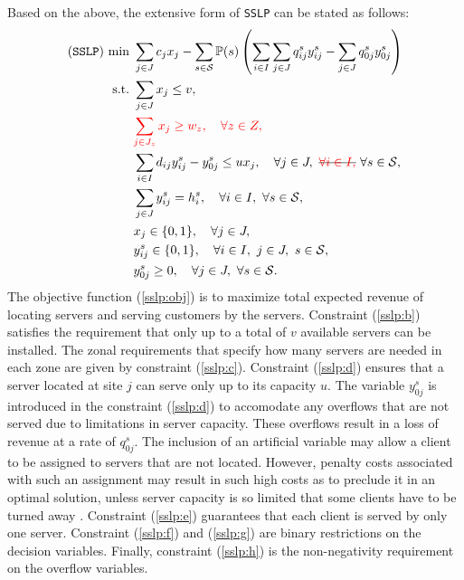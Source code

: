 Based on the above, the extensive form of \texttt{SSLP} can be stated as follows:
\begin{subequations}
	\begin{align}
	(\texttt{SSLP})\ \textrm{min}\ &	\sum_{j\in J}c_j x_j - \sum_{s\in\mathcal{S}}\PP(s)\left(\sum_{i\in I}\sum_{j\in J}q_{ij}^s y_{ij}^s - \sum_{j\in J}q_{0j}^s y_{0j}^s \right) \label{sslp:obj} \\ 
	\textrm{s.t.}\ &\sum_{j\in J}x_j\le v,\label{sslp:b}\\ 
	&\textcolor{red}{\sum_{j\in J_z}x_j\ge w_z,\quad\forall z\in Z,}\label{sslp:c}\\
	&\sum_{i\in I}d_{ij}y_{ij}^s - y_{0j}^s\le ux_j,\quad\forall j\in J,\ \stkout{\textcolor{red}{\forall i\in I,}}\ \forall s\in\mathcal{S}, \label{sslp:d} \\
	&\sum_{j\in J}y_{ij}^s=h_i^s,\quad\forall i\in I,\ \forall s\in \mathcal{S}, \label{sslp:e}\\
	&x_j\in\{0,1\},\quad\forall j\in J,\label{sslp:f}\\
	&y_{ij}^s\in\{0,1\},\quad\forall i\in I,\ j\in J,\ s\in\mathcal{S}, \label{sslp:g}\\
	&y_{0j}^s\ge 0,\quad\forall j\in J,\ \forall s\in\mathcal{S} \label{sslp:h}.
	\end{align}
\end{subequations}
The objective function (\ref{sslp:obj}) is to maximize total expected revenue of locating servers and serving customers by the servers. Constraint (\ref{sslp:b}) satisfies the requirement that only up to a total of $v$ available servers can be installed. The zonal requirements that specify how many servers are needed in each zone are given by constraint (\ref{sslp:c}). Constraint (\ref{sslp:d}) ensures that a server located at site $j$ can serve only up to its capacity $u$. The variable $y_{0j}^s$ is introduced in the constraint (\ref{sslp:d}) to accomodate any overflows that are not served due to limitations in server capacity. These overflows result in a loss of revenue at a rate of $q_{0j}^s$. The inclusion of an artificial variable may allow a client to be assigned to servers that are not located. However, penalty costs associated with such an assignment may result in such high costs as to preclude it in an optimal solution, unless server capacity is so limited that some clients have to be turned away \cite{journal:NS2005}. Constraint (\ref{sslp:e}) guarantees that each client is served by only one server. Constraint (\ref{sslp:f}) and (\ref{sslp:g}) are binary restrictions on the decision variables. Finally, constraint (\ref{sslp:h}) is the non-negativity requirement on the overflow variables.
